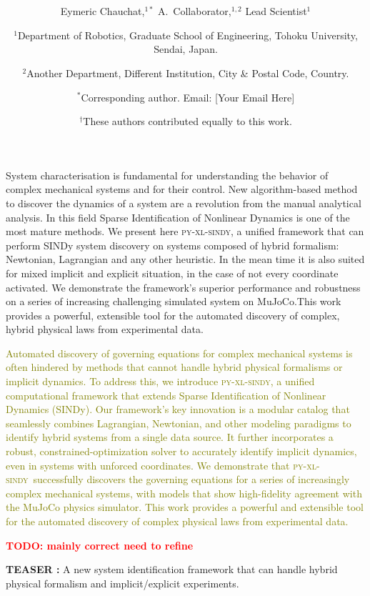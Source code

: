 \documentclass[12pt]{article}
\date{}
\title{\bfseries \boldmath \scititle}
\author{
	Eymeric Chauchat,$^{1\ast}$
	A.~Collaborator,$^{1,2}$
	Lead Scientist$^{1}$\and
	\small$^{1}$Department of Robotics, Graduate School of Engineering, Tohoku University, Sendai, Japan.\and
	\small$^{2}$Another Department, Different Institution, City \& Postal Code, Country.\and
	\small$^\ast$Corresponding author. Email: [Your Email Here]\and
	\small$^\dagger$These authors contributed equally to this work.
	\TODO{correctly format, add correct people}
}
\renewenvironment{abstract}
	{\quotation}
	{\endquotation}
\newcommand{\frameworkname}{\textsc{py-xl-sindy}}
\newcommand{\TODO}[1]{\textbf{\textcolor{red}{\Large TODO: \normalsize #1}}}
\newcommand{\airevised}[1]{\textcolor{olive}{\small #1}}
\begin{document}
 

\maketitle

\begin{abstract} \bfseries \boldmath


System characterisation is fundamental for understanding the behavior of complex mechanical systems and for their control. New algorithm-based method to discover the dynamics of a system are a revolution from the manual analytical analysis. In this field Sparse Identification of Nonlinear Dynamics is one of the most mature methods. We present here \frameworkname, a unified framework that can perform SINDy system discovery on systems composed of hybrid formalism: Newtonian, Lagrangian and any other heuristic. In the mean time it is also suited for mixed implicit and explicit situation, in the case of not every coordinate activated. We demonstrate the framework's superior performance and robustness on a series of increasing challenging simulated system on MuJoCo.This work provides a powerful, extensible tool for the automated discovery of complex, hybrid physical laws from experimental data.

\airevised{Automated discovery of governing equations for complex mechanical systems is often hindered by methods that cannot handle hybrid physical formalisms or implicit dynamics. To address this, we introduce \frameworkname, a unified computational framework that extends Sparse Identification of Nonlinear Dynamics (SINDy). Our framework's key innovation is a modular catalog that seamlessly combines Lagrangian, Newtonian, and other modeling paradigms to identify hybrid systems from a single data source. It further incorporates a robust, constrained-optimization solver to accurately identify implicit dynamics, even in systems with unforced coordinates. We demonstrate that \frameworkname\ successfully discovers the governing equations for a series of increasingly complex mechanical systems, with models that show high-fidelity agreement with the MuJoCo physics simulator. This work provides a powerful and extensible tool for the automated discovery of complex physical laws from experimental data.}

\TODO{mainly correct need to refine}
\end{abstract}

\textbf{TEASER : } A new system identification framework that can handle hybrid physical formalism and implicit/explicit experiments.
\end{document}
